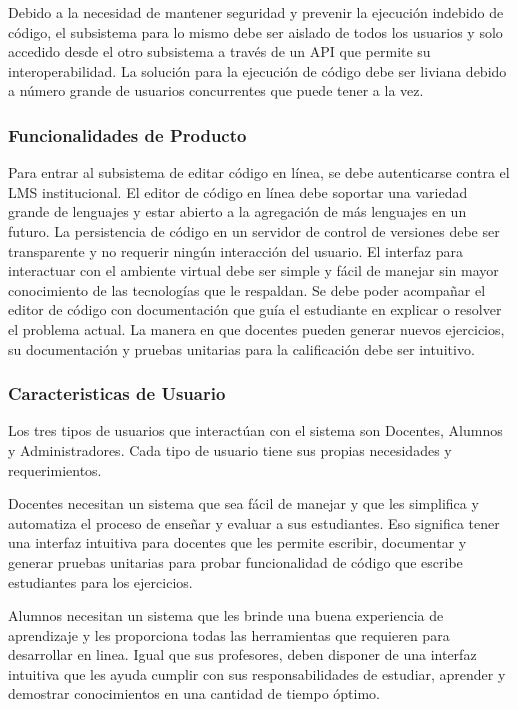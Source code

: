 Debido a la necesidad de mantener seguridad y prevenir la ejecución indebido de código, el subsistema para lo mismo debe ser aislado de todos los usuarios y solo accedido desde el otro subsistema a través de un API que permite su interoperabilidad. La solución para la ejecución de código debe ser liviana debido a número grande de usuarios concurrentes que puede tener a la vez.

\subsubsection{Funcionalidades de Producto}
Para entrar al subsistema de editar código en línea, se debe autenticarse contra el LMS institucional. El editor de código en línea debe soportar una variedad grande de lenguajes y estar abierto a la agregación de más lenguajes en un futuro. La persistencia de código en un servidor de control de versiones debe ser transparente y no requerir ningún interacción del usuario. El interfaz para interactuar con el ambiente virtual debe ser simple y fácil de manejar sin mayor conocimiento de las tecnologías que le respaldan. Se debe poder acompañar el editor de código con documentación que guía el estudiante en explicar o resolver el problema actual. La manera en que docentes pueden generar nuevos ejercicios, su documentación y pruebas unitarias para la calificación debe ser intuitivo.

\subsubsection{Caracteristicas de Usuario}
Los tres tipos de usuarios que interactúan con el sistema son Docentes, Alumnos y Administradores. Cada tipo de usuario tiene sus propias necesidades y requerimientos.

Docentes necesitan un sistema que sea fácil de manejar y que les simplifica y automatiza el proceso de enseñar y evaluar a sus estudiantes. Eso significa tener una interfaz intuitiva para docentes que les permite escribir, documentar y generar pruebas unitarias para probar funcionalidad de código que escribe estudiantes para los ejercicios.

Alumnos necesitan un sistema que les brinde una buena experiencia de aprendizaje y les proporciona todas las herramientas que requieren para desarrollar en linea. Igual que sus profesores, deben disponer de una interfaz intuitiva que les ayuda cumplir con sus responsabilidades de estudiar, aprender y demostrar conocimientos en una cantidad de tiempo óptimo.

